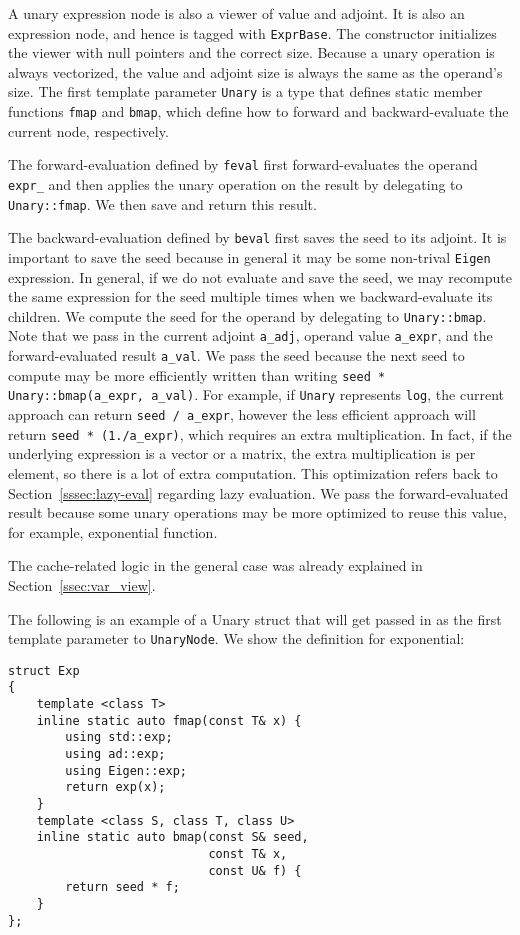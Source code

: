 A unary expression node is also a viewer of value and adjoint.
It is also an expression node, and hence is tagged with \verb|ExprBase|.
The constructor initializes the viewer with null pointers and the correct size.
Because a unary operation is always vectorized,
the value and adjoint size is always the same as the operand's size.
The first template parameter \verb|Unary| is a type that defines
static member functions \verb|fmap| and \verb|bmap|,
which define how to forward and backward-evaluate the current node, respectively.

The forward-evaluation defined by \verb|feval| first
forward-evaluates the operand \verb|expr_| and then applies the unary operation
on the result by delegating to \verb|Unary::fmap|.
We then save and return this result.

The backward-evaluation defined by \verb|beval| first saves the seed to its adjoint.
It is important to save the seed because in general it may be some 
non-trival \verb|Eigen| expression.
In general, if we do not evaluate and save the seed,
we may recompute the same expression for the seed multiple times 
when we backward-evaluate its children.
We compute the seed for the operand by delegating to \verb|Unary::bmap|.
Note that we pass in the current adjoint \verb|a_adj|, 
operand value \verb|a_expr|, and 
the forward-evaluated result \verb|a_val|.
We pass the seed because the next seed to compute may be more efficiently written 
than writing \verb|seed * Unary::bmap(a_expr, a_val)|.
For example, if \verb|Unary| represents \verb|log|,
the current approach can return \verb|seed / a_expr|, however
the less efficient approach will return \verb|seed * (1./a_expr)|,
which requires an extra multiplication.
In fact, if the underlying expression is a vector or a matrix,
the extra multiplication is per element, so there is a lot of extra computation.
This optimization refers back to Section~\ref{sssec:lazy-eval} regarding lazy evaluation.
We pass the forward-evaluated result because
some unary operations may be more optimized to reuse this value,
for example, exponential function.

The cache-related logic in the general case was already explained in Section~\ref{ssec:var_view}.

The following is an example of a Unary struct that will get passed in 
as the first template parameter to \verb|UnaryNode|.
We show the definition for exponential:
\begin{lstlisting}[style=customcpp]
struct Exp
{
    template <class T>
	inline static auto fmap(const T& x) {
        using std::exp;
        using ad::exp;
        using Eigen::exp;
        return exp(x);
	}
    template <class S, class T, class U> 
	inline static auto bmap(const S& seed,
                            const T& x,
                            const U& f) {
        return seed * f;
	}
};
\end{lstlisting}

